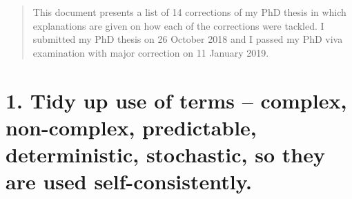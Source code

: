 \documentclass[12pt]{article}
\begin{document}
\maketitle


\begin{abstract}
This document presents a list of 14 corrections 
of my PhD thesis in which explanations 
are given on how each of the corrections were tackled.
I submitted my PhD thesis on 26 October 2018 and
I passed my PhD viva examination with major correction
on 11 January 2019. 
\end{abstract}





\section*{1.  
	Tidy up use of terms -- complex, non-complex, predictable, 
	deterministic, stochastic, so they are used self-consistently.
}
\end{document}

